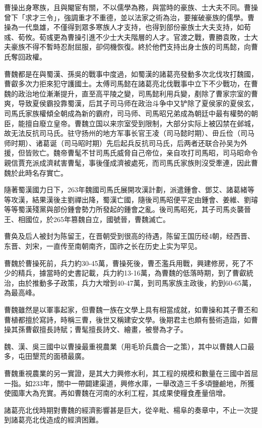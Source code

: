 曹操出身寒族，且與閹宦有關，不以儒學為務，與當時的豪族、士大夫不同。曹操曾下「求才三令」，強調重才不重德，並以法家之術為治，要摧破豪族的儒學。曹操為一代梟雄，不僅得到眾多寒族人才支持，也得到部份豪族士大夫支持，如荀彧、荀攸。荀彧更為曹操引進不少士大夫階層的人才。官渡之戰，曹勝袁敗，士大夫豪族不得不暫時忍耐屈服，卻伺機恢復。終於他們支持出身士族的司馬懿，向曹氏奪回政權。

曹魏都是在與蜀漢、孫吳的戰事中度過，如蜀漢的諸葛亮發動多次北伐攻打魏國，曹叡多次力拒來犯守護國土。太傅司馬懿在諸葛亮北伐戰事中立下不少戰功，在曹魏的政治地位漸漸提升，直至高平陵之變，司馬懿利用兵變，剷除了曹家宗室的曹爽，导致夏侯霸投靠蜀漢，后其子司马师在政治斗争中又铲除了夏侯家的夏侯玄，司馬氏家族權傾全朝成為新的霸府，司马师、司馬昭兄弟成為朝廷中最有權勢的朝臣，能擅自廢立皇帝。曹魏立国以来宗室受到限制，大部分实际上被囚禁在邺城，故无法反抗司马氏。驻守扬州的地方军事长官王凌（司马懿时期）、毌丘俭（司马师时期）、诸葛诞（司马昭时期）先后起兵反抗司马氏，后两者还联合孙吴为外援，但皆败亡。魏帝曹髦不甘司馬氏威脅自己帝位，亲自攻打司馬昭，司马昭命令親信賈充派成濟弒害曹髦，事後僅成濟被處死，而司馬氏家族則沒受牽連，因此曹魏於此時名存實亡。

隨著蜀漢國力日下，263年魏國司馬氏展開攻漢計劃，派遣鍾會、鄧艾、諸葛緒等等攻漢，結果漢後主劉禪出降，蜀漢亡國，隨後司馬昭便平定由鍾會、姜維、劉璿等等蜀漢殘黨與部份鍾會勢力所發起的鍾會之亂。後司馬昭死，其子司馬炎襲晉王、相國位，於265年篡魏自立，國號晉，曹魏滅亡。

曹奂及后人被封为陈留王，在晋朝受到很高的待遇，陈留王国历经4朝，经西晋、东晋、刘宋，一直传至南朝南齐，国祚之长在历史上实为罕见。

曹魏於曹操死前，兵力約30-45萬，曹操死後，曹丕濫兵用戰，興建修房，死了不少的精兵，據當時的史書記載，兵力約13-16萬，為曹魏的低落時期，到了曹叡統治，由於推動多子政策，兵力大增到40-47萬，到司馬家族主政後，約到60-65萬，為最高峰。

曹魏雖然是以軍事起家，但曹魏一族在文學上具有相當成就，如曹操和其子曹丕和曹植都擅於寫詩，時稱三曹，後世又稱建安文學。後期君主也頗有藝術造詣，如曹操其孫曹叡擅長詩賦；曹髦擅長詩文、繪畫，被譽為才子。

魏、漢、吳三國中以曹操最重視農業（用毛玠兵農合一之策），其中以曹魏人口最多，屯田墾荒的面積最廣。

曹魏重視農業的另一實證，是其大力興修水利，其工程的規模和數量在三國中首屈一指。如233年，關中一帶闢建渠道，興修水庫，一舉改造三千多頃鹽鹼地，所獲使國庫大為充實。再如曹魏在河南的水利工程，其成果使糧食產量倍增。

諸葛亮北伐時期對曹魏的經濟影響甚是巨大，從辛毗、楊阜的奏章中，不止一次提到諸葛亮北伐造成的經濟困難。

